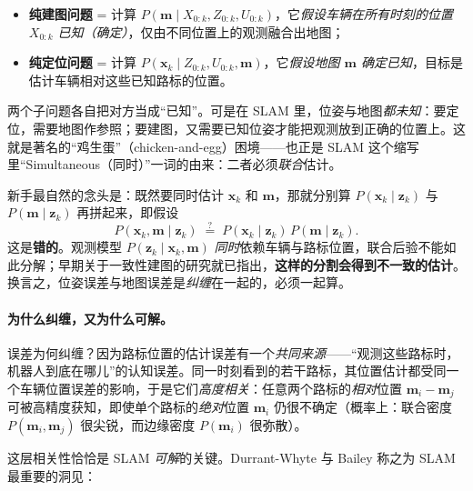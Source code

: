 \begin{itemize}
  \item \textbf{纯建图问题} = 计算 $P(\mathbf{m}\mid X_{0:k},Z_{0:k},U_{0:k})$，它\emph{假设车辆在所有时刻的位置 $X_{0:k}$ 已知（确定）}，仅由不同位置上的观测融合出地图；
  \item \textbf{纯定位问题} = 计算 $P(\mathbf{x}_k\mid Z_{0:k},U_{0:k},\mathbf{m})$，它\emph{假设地图 $\mathbf{m}$ 确定已知}，目标是估计车辆相对这些已知路标的位置。
\end{itemize}

\noindent 两个子问题各自把对方当成“已知”。可是在 SLAM 里，位姿与地图\emph{都未知}：要定位，需要地图作参照；要建图，又需要已知位姿才能把观测放到正确的位置上。这就是著名的“鸡生蛋”（chicken-and-egg）困境——也正是 SLAM 这个缩写里“Simultaneous（同时）”一词的由来：二者必须\emph{联合}估计。

\begin{pitfall}
新手最自然的念头是：既然要同时估计 $\mathbf{x}_k$ 和 $\mathbf{m}$，那就分别算 $P(\mathbf{x}_k\mid \mathbf{z}_k)$ 与 $P(\mathbf{m}\mid \mathbf{z}_k)$ 再拼起来，即假设
\begin{equation}
  P(\mathbf{x}_k,\mathbf{m}\mid \mathbf{z}_k)\;\overset{?}{=}\;P(\mathbf{x}_k\mid \mathbf{z}_k)\,P(\mathbf{m}\mid \mathbf{z}_k).
  \label{eq:intro-bad-partition}
\end{equation}
这是\textbf{错的}。观测模型 $P(\mathbf{z}_k\mid \mathbf{x}_k,\mathbf{m})$ \emph{同时}依赖车辆与路标位置，联合后验不能如此分解；早期关于一致性建图的研究就已指出，\textbf{这样的分割会得到不一致的估计}\cite{durrantwhyte2006slam}。换言之，位姿误差与地图误差是\emph{纠缠}在一起的，必须一起算。
\end{pitfall}

\paragraph{为什么纠缠，又为什么可解。}
误差为何纠缠？因为路标位置的估计误差有一个\emph{共同来源}——“观测这些路标时，机器人到底在哪儿”的认知误差\cite{durrantwhyte2006slam}。同一时刻看到的若干路标，其位置估计都受同一个车辆位置误差的影响，于是它们\emph{高度相关}：任意两个路标的\emph{相对}位置 $\mathbf{m}_i-\mathbf{m}_j$ 可被高精度获知，即使单个路标的\emph{绝对}位置 $\mathbf{m}_i$ 仍很不确定（概率上：联合密度 $P(\mathbf{m}_i,\mathbf{m}_j)$ 很尖锐，而边缘密度 $P(\mathbf{m}_i)$ 很弥散）。

这层相关性恰恰是 SLAM \emph{可解}的关键。Durrant-Whyte 与 Bailey\cite{durrantwhyte2006slam} 称之为 SLAM 最重要的洞见：

